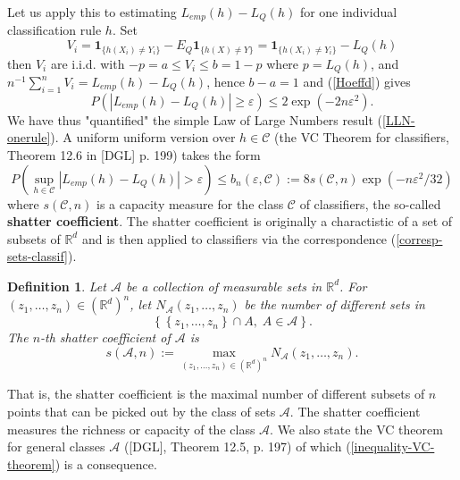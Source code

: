 \documentclass[11pt,twoside]{article}%
\theoremstyle{change}
\newtheorem{definition}[theorem]{Definition}
\begin{document}
Let us apply this to estimating $L_{emp}(h)-L_{Q}(h)$ for one individual
classification rule $h$. Set
\[
V_{i}=\mathbf{1}_{\{h(X_{i})\neq Y_{i}\}}-E_{Q}\mathbf{1}_{\{h(X)\neq
Y\}}=\mathbf{1}_{\{h(X_{i})\neq Y_{i}\}}-L_{Q}(h)
\]
then $V_{i}$ are i.i.d. with $-p=a\leq V_{i}\leq b=1-p$ where $p=L_{Q}(h)$,
and $n^{-1}\sum_{i=1}^{n}V_{i}=L_{emp}(h)-L_{Q}(h)$, hence $b-a=1$ and
(\ref{Hoeffd}) gives
\[
P\left(  \left\vert L_{emp}(h)-L_{Q}(h)\right\vert \geq\varepsilon\right)
\leq2\exp\left(  -2n\varepsilon^{2}\right)  .
\]
We have thus "quantified" the simple Law of Large Numbers result
(\ref{LLN-onerule}). A uniform uniform version over $h\in\mathcal{C}$ (the VC
Theorem for classifiers, Theorem 12.6 in [DGL] p. 199) takes the form%
\begin{equation}
P\left(  \sup_{h\in\mathcal{C}}\left\vert L_{emp}(h)-L_{Q}(h)\right\vert
>\varepsilon\right)  \leq b_{n}(\varepsilon,\mathcal{C}):=8s\left(
\mathcal{C},n\right)  \exp\left(  -n\varepsilon^{2}/32\right)
\label{inequality-VC-theorem}%
\end{equation}
where $s\left(  \mathcal{C},n\right)  $ is a capacity measure for the class
$\mathcal{C}$ of classifiers, the so-called \textbf{shatter coefficient}. The
shatter coefficient is originally a charactistic of a set of subsets of
$\mathbb{R}^{d}$ and is then applied to classifiers via the correspondence
(\ref{corresp-sets-classif}).

\begin{definition}
Let $\mathcal{A}$ be a collection of measurable sets in $\mathbb{R}^{d}$. For
$\left(  z_{1},\ldots,z_{n}\right)  \in\left(  \mathbb{R}^{d}\right)  ^{n} $,
let $N_{\mathcal{A}}\left(  z_{1},\ldots,z_{n}\right)  $ be the number of
different sets in
\[
\left\{  \left\{  z_{1},\ldots,z_{n}\right\}  \cap A,\;A\in\mathcal{A}%
\right\}  .
\]
The $n$-th shatter coefficient of $\mathcal{A}$ is
\[
s\left(  \mathcal{A},n\right)  :=\max_{\left(  z_{1},\ldots,z_{n}\right)
\in\left(  \mathbb{R}^{d}\right)  ^{n}}N_{\mathcal{A}}\left(  z_{1}%
,\ldots,z_{n}\right)  .
\]

\end{definition}

That is, the shatter coefficient is the maximal number of different subsets of
$n$ points that can be picked out by the class of sets $\mathcal{A}$. The
shatter coefficient measures the richness or capacity of the class
$\mathcal{A}$. We also state the VC theorem for general classes $\mathcal{A}$
([DGL], Theorem 12.5, p. 197) of which (\ref{inequality-VC-theorem}) is a consequence.
\end{document}

